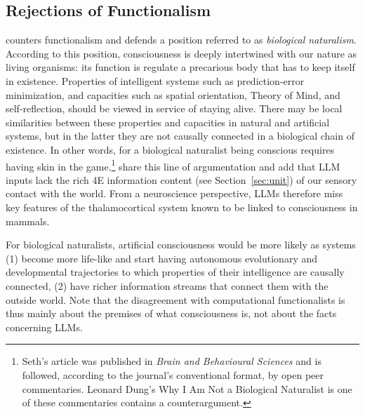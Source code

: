 \subsection{Rejections of Functionalism} \label{againstfunct}
\citep{seth2025conscious} counters functionalism and defends a position referred to as \emph{biological naturalism}. According to this position, consciousness is deeply intertwined with our nature as living organisms: its function is regulate a precarious body that has to keep itself in existence. Properties of intelligent systems such as prediction-error minimization, and capacities such as spatial orientation, Theory of Mind, and self-reflection, should be viewed in service of staying alive. There may be local similarities between these properties and capacities in natural and artificial systems, but in the latter they are not causally connected in a biological chain of existence. In other words, for a biological naturalist being conscious requires having skin in the game.\footnote{Seth's article was published in \textit{Brain and Behavioural Sciences} and is followed, according to the journal's conventional format, by open peer commentaries. Leonard Dung's Why I Am Not a Biological Naturalist is one of these commentaries contains a counterargument.} \citet{aru2023feasibility} share this line of argumentation and add that LLM inputs lack the rich 4E information content (see Section~\ref{sec:unit}) of our sensory contact with the world. From a neuroscience perspective, LLMs therefore miss key features of the thalamocortical system known to be linked to consciousness in mammals. 

For biological naturalists, artificial consciousness would be more likely as systems (1) become more life-like and start having autonomous evolutionary and developmental trajectories to which properties of their intelligence are causally connected, (2) have richer information streams that connect them with the outside world. Note that the disagreement with computational functionalists is thus mainly about the premises of what consciousness is, not about the facts concerning LLMs.

